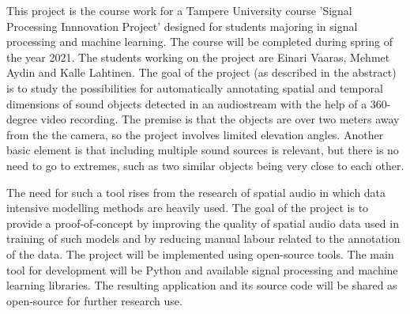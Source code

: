 This project is the course work for a Tampere University course 'Signal Processing Innnovation Project' designed for students majoring in signal processing and machine learning. The course will be completed during spring of the year 2021. The students working on the project are Einari Vaaras, Mehmet Aydin and Kalle Lahtinen. The goal of the project (as described in the abstract) is to study the possibilities for automatically annotating spatial and temporal dimensions of sound objects detected in an audiostream with the help of a 360-degree video recording. The premise is that the objects are over two meters away from the the camera, so the project involves limited elevation angles. Another basic element is that including multiple sound sources is relevant, but there is no need to go to extremes, such as two similar objects being very close to each other.

The need for such a tool rises from the research of spatial audio in which data intensive modelling methods are heavily used. The goal of the project is to provide a proof-of-concept by improving the quality of spatial audio data used in training of such models and by reducing manual labour related to the annotation of the data. The project will be implemented using open-source tools. The main tool for development will be Python and available signal processing and machine learning libraries. The resulting application and its source code will be shared as open-source for further research use.  